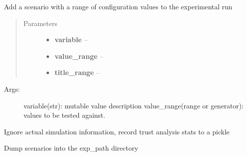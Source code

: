 \documentclass[letterpaper,10pt,english]{sphinxmanual}
\begin{document}
\begin{fulllineitems}
\begin{fulllineitems}
\end{fulllineitems}


\begin{fulllineitems}
\label{index:polybos.ExperimentManager.add_variable_range_scenario}
Add a scenario with a range of configuration values to the experimental run
\begin{quote}\begin{description}
\item[{Parameters}] \leavevmode\begin{itemize}
\item {} 
\textbf{variable} -- 

\item {} 
\textbf{value\_range} -- 

\item {} 
\textbf{title\_range} -- 

\end{itemize}

\end{description}\end{quote}
\begin{description}
\item[{Args:}] \leavevmode
variable(str): mutable value description
value\_range(range or generator): values to be tested against.

\end{description}

\end{fulllineitems}


\begin{fulllineitems}
\label{index:polybos.ExperimentManager.dump_analysis}
Ignore actual simulation information, record trust analysis stats to a pickle

\end{fulllineitems}


\begin{fulllineitems}
\label{index:polybos.ExperimentManager.dump_dataruns}
Dump scenarios into the exp\_path directory


\end{fulllineitems}
\end{fulllineitems}
\end{document}
